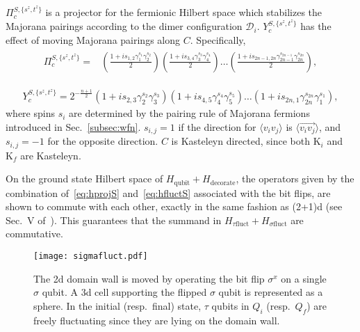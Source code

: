 \documentclass[12pt]{article}
\numberwithin{equation}{section}
\begin{document}
$\Pi_c^{S,\{s^z,t^z\}}$ is a projector for the fermionic Hilbert space which stabilizes the Majorana pairings according to the dimer configuration $\mathcal{D}_i$.
$Y_c^{S,\{s^z,t^z\}}$ has the effect of moving Majorana pairings along $C$. Specifically,
\begin{align}
\begin{split}
    \Pi_{c}^{S,\{s^z,t^z\}}=& \left(\frac{1+is_{1,2}\gamma_1^{s_1}\gamma_2^{s_2}}{2}\right)\left(\frac{1+is_{3,4}\gamma_3^{s_3}\gamma_4^{s_4}}{2}\right)\dots \left(\frac{1+is_{2n-1,2n}\gamma_{2n-1}^{s_{2n-1}}\gamma_{2n}^{s_{2n}}}{2}\right),
    \end{split}
    \label{eq:hprojS}
\end{align}

\begin{align}
    Y_c^{S,\{s^z,t^z\}}=2^{-\frac{n+1}{2}}(1+is_{2,3}\gamma_2^{s_2}\gamma_3^{s_3})(1+is_{4,5}\gamma_4^{s_4}\gamma_5^{s_5})\dots(1+is_{2n,1}\gamma_{2n}^{s_{2n}}\gamma_1^{s_1}),
    \label{eq:hfluctS}
\end{align}
where spins $s_i$ are determined by the pairing rule of Majorana fermions introduced in Sec.~\ref{subsec:wfn}. $s_{i,j}=1$ if the direction for $\langle v_iv_j\rangle$ is $\langle\overrightarrow{v_iv_j}\rangle$, and $s_{i,j}=-1$ for the opposite direction.
$C$ is Kasteleyn directed, since both $\mathrm{K}_i$ and $\mathrm{K}_f$ are Kasteleyn.

On the ground state Hilbert space of $H_{\mathrm{qubit}}+H_{\mathrm{decorate}}$, the operators given by the combination of~\eqref{eq:hprojS} and~\eqref{eq:hfluctS} associated with the bit flips, are shown to commute with each other, exactly in the same fashion as (2+1)d (see Sec.~V of~\cite{Tarantino}). This guarantees that the summand in $H_{\tau\mathrm{fluct}}+H_{\sigma\mathrm{fluct}}$ are commutative.


\begin{figure}[htb]
\centering
\texttt{[image: sigmafluct.pdf]}
\caption{The 2d domain wall is moved by operating the bit flip $\sigma^x$ on a single $\sigma$ qubit. A 3d cell supporting the flipped $\sigma$ qubit is represented as a sphere. In the initial (resp.~final) state, $\tau$ qubits in $Q_i$ (resp.~$Q_f$) are freely fluctuating since they are lying on the domain wall. }
\label{fig:sigmafluct}
\end{figure}
\end{document}
